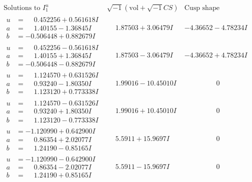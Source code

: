 \documentclass[1p]{elsarticle_modified}
\theoremstyle{definition}
\newcommand{\I}{\sqrt{-1}}
\begin{document}
$$\begin{array}{c|c|c}
\text{Solutions to }I^u_{1}& \I (\text{vol} + \sqrt{-1}CS) & \text{Cusp shape}\\
 \hline 
\begin{aligned}
u &= \phantom{-}0.452256 + 0.561618 I \\
a &= \phantom{-}1.40155 - 1.36845 I \\
b &= -0.506448 + 0.882679 I\end{aligned}
 & \phantom{-}1.87503 + 3.06479 I & -4.36652 - 4.78234 I \\ \hline\begin{aligned}
u &= \phantom{-}0.452256 - 0.561618 I \\
a &= \phantom{-}1.40155 + 1.36845 I \\
b &= -0.506448 - 0.882679 I\end{aligned}
 & \phantom{-}1.87503 - 3.06479 I & -4.36652 + 4.78234 I \\ \hline\begin{aligned}
u &= \phantom{-}1.124570 + 0.631526 I \\
a &= \phantom{-}0.93240 - 1.80350 I \\
b &= \phantom{-}1.123120 + 0.773338 I\end{aligned}
 & \phantom{-}1.99016 - 10.45010 I & \phantom{-0.000000 } 0 \\ \hline\begin{aligned}
u &= \phantom{-}1.124570 - 0.631526 I \\
a &= \phantom{-}0.93240 + 1.80350 I \\
b &= \phantom{-}1.123120 - 0.773338 I\end{aligned}
 & \phantom{-}1.99016 + 10.45010 I & \phantom{-0.000000 } 0 \\ \hline\begin{aligned}
u &= -1.120990 + 0.642900 I \\
a &= \phantom{-}0.86354 + 2.02077 I \\
b &= \phantom{-}1.24190 - 0.85165 I\end{aligned}
 & \phantom{-}5.5911 + 15.9697 I & \phantom{-0.000000 } 0 \\ \hline\begin{aligned}
u &= -1.120990 - 0.642900 I \\
a &= \phantom{-}0.86354 - 2.02077 I \\
b &= \phantom{-}1.24190 + 0.85165 I\end{aligned}
 & \phantom{-}5.5911 - 15.9697 I & \phantom{-0.000000 } 0 \\ \hline\begin{aligned}

\end{aligned}
\end{array}$$
\end{document}
